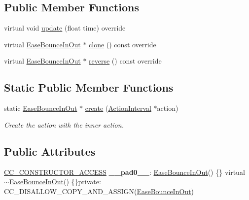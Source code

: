 \subsection*{Public Member Functions}
\begin{DoxyCompactItemize}
\item 
virtual void \hyperlink{classEaseBounceInOut_abd929d5112158561a9d793a46cc51fc1}{update} (float time) override
\item 
virtual \hyperlink{classEaseBounceInOut}{Ease\+Bounce\+In\+Out} $\ast$ \hyperlink{classEaseBounceInOut_acc12db9c905d8d49b135e084a9beef5e}{clone} () const override
\item 
virtual \hyperlink{classEaseBounceInOut}{Ease\+Bounce\+In\+Out} $\ast$ \hyperlink{classEaseBounceInOut_a5fce37e1a14d4f5ed99d19fad6b354f9}{reverse} () const override
\end{DoxyCompactItemize}
\subsection*{Static Public Member Functions}
\begin{DoxyCompactItemize}
\item 
static \hyperlink{classEaseBounceInOut}{Ease\+Bounce\+In\+Out} $\ast$ \hyperlink{classEaseBounceInOut_acb4ffccc3c3234d5ef58e82334e48ce8}{create} (\hyperlink{classActionInterval}{Action\+Interval} $\ast$action)
\begin{DoxyCompactList}\small\item\em Create the action with the inner action. \end{DoxyCompactList}\end{DoxyCompactItemize}
\subsection*{Public Attributes}
\begin{DoxyCompactItemize}
\item 
\mbox{\label{classEaseBounceInOut_aff31de0d30d914d19a0700724fccec38}} 
\hyperlink{_2cocos2d_2cocos_2base_2ccConfig_8h_a25ef1314f97c35a2ed3d029b0ead6da0}{C\+C\+\_\+\+C\+O\+N\+S\+T\+R\+U\+C\+T\+O\+R\+\_\+\+A\+C\+C\+E\+SS} {\bfseries \+\_\+\+\_\+pad0\+\_\+\+\_\+}\+: \hyperlink{classEaseBounceInOut}{Ease\+Bounce\+In\+Out}() \{\} virtual $\sim$\hyperlink{classEaseBounceInOut}{Ease\+Bounce\+In\+Out}() \{\}private\+: C\+C\+\_\+\+D\+I\+S\+A\+L\+L\+O\+W\+\_\+\+C\+O\+P\+Y\+\_\+\+A\+N\+D\+\_\+\+A\+S\+S\+I\+GN(\hyperlink{classEaseBounceInOut}{Ease\+Bounce\+In\+Out})
\end{DoxyCompactItemize}
